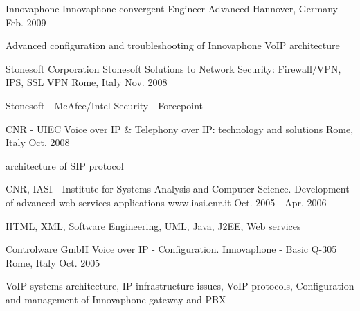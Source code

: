 \begin{cventries}
	\cventry
	{Innovaphone} %
	{Innovaphone convergent Engineer Advanced} %
	{Hannover, Germany} %
	{Feb. 2009} %
	{ %
		\begin{cvitems}
			\item {Advanced configuration and troubleshooting of Innovaphone VoIP architecture}
		\end{cvitems}
	}

	\cventry
	{Stonesoft Corporation} %
	{Stonesoft Solutions to Network Security: Firewall/VPN, IPS, SSL VPN} %
	{Rome, Italy} %
	{Nov. 2008} %
	{ %
		\begin{cvitems}
			\item {Stonesoft - McAfee/Intel Security - Forcepoint}
		\end{cvitems}
	}

	\cventry
	{CNR - UIEC} %
	{Voice over IP \& Telephony over IP: technology and solutions} %
	{Rome, Italy} %
	{Oct. 2008} %
	{ %
		\begin{cvitems}
			\item {architecture of SIP protocol}
		\end{cvitems}
	}
	
	\cventry
	{CNR, IASI - Institute for Systems Analysis and Computer Science.} %
	{Development of advanced web services applications\linebreak{}} %
	{www.iasi.cnr.it} %
	{Oct. 2005 - Apr. 2006} %
	{ %
		\begin{cvitems}
			\item {HTML, XML, Software Engineering, UML, Java, J2EE, Web services }
		\end{cvitems}
	}

	\cventry
	{Controlware GmbH} %
	{Voice over IP - Configuration. Innovaphone - Basic Q-305} %
	{Rome, Italy} %
	{Oct. 2005} %
	{ %
		\begin{cvitems}
			\item {VoIP systems architecture, IP infrastructure issues, VoIP protocols, Configuration and management of Innovaphone gateway and PBX}
		\end{cvitems}
	}


\end{cventries}
